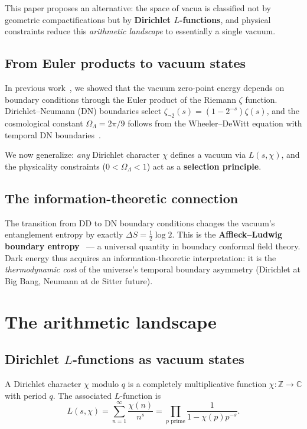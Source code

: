 \documentclass[11pt,a4paper]{article}
\begin{document}
This paper proposes an alternative: the space of vacua is
classified not by geometric compactifications but by
\textbf{Dirichlet $L$-functions}, and physical constraints reduce
this \emph{arithmetic landscape} to essentially a single vacuum.

\subsection{From Euler products to vacuum states}

In previous work~\cite{wb-functional}, we showed that the vacuum
zero-point energy depends on boundary conditions through the Euler
product of the Riemann $\zeta$ function. Dirichlet--Neumann (DN)
boundaries select $\zeta_{\neg 2}(s) = (1 - 2^{-s})\zeta(s)$,
and the cosmological constant $\Omega_\Lambda = 2\pi/9$ follows
from the Wheeler--DeWitt equation with temporal DN
boundaries~\cite{wb-wdw}.

We now generalize: \emph{any} Dirichlet character $\chi$ defines a
vacuum via $L(s, \chi)$, and the physicality constraints
($0 < \Omega_\Lambda < 1$) act as a \textbf{selection principle}.

\subsection{The information-theoretic connection}

The transition from DD to DN boundary conditions changes the
vacuum's entanglement entropy by exactly
$\Delta S = \frac{1}{2}\log 2$. This is the
\textbf{Affleck--Ludwig boundary entropy}~\cite{AffleckLudwig1991}
--- a universal quantity in boundary conformal field theory.
Dark energy thus acquires an information-theoretic interpretation:
it is the \emph{thermodynamic cost} of the universe's temporal
boundary asymmetry (Dirichlet at Big Bang, Neumann at de Sitter
future).

\section{The arithmetic landscape}

\subsection{Dirichlet $L$-functions as vacuum states}

A Dirichlet character $\chi$ modulo $q$ is a completely
multiplicative function $\chi: \mathbb{Z} \to \mathbb{C}$ with
period $q$. The associated $L$-function is
\begin{equation}
L(s, \chi) = \sum_{n=1}^\infty \frac{\chi(n)}{n^s}
= \prod_{p\text{ prime}} \frac{1}{1 - \chi(p)p^{-s}}.
\end{equation}
\end{document}

